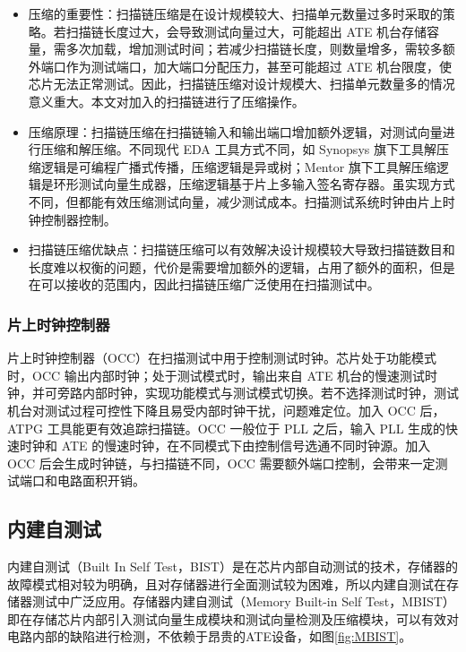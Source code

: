 \begin{itemize}
\item
  压缩的重要性：扫描链压缩是在设计规模较大、扫描单元数量过多时采取的策略。若扫描链长度过大，会导致测试向量过大，可能超出
  ATE
  机台存储容量，需多次加载，增加测试时间；若减少扫描链长度，则数量增多，需较多额外端口作为测试端口，加大端口分配压力，甚至可能超过
  ATE
  机台限度，使芯片无法正常测试。因此，扫描链压缩对设计规模大、扫描单元数量多的情况意义重大。本文对加入的扫描链进行了压缩操作。
\item
  压缩原理：扫描链压缩在扫描链输入和输出端口增加额外逻辑，对测试向量进行压缩和解压缩。不同现代
  EDA 工具方式不同，如 Synopsys
  旗下工具解压缩逻辑是可编程广播式传播，压缩逻辑是异或树；Mentor
  旗下工具解压缩逻辑是环形测试向量生成器，压缩逻辑基于片上多输入签名寄存器。虽实现方式不同，但都能有效压缩测试向量，减少测试成本。扫描测试系统时钟由片上时钟控制器控制。
\item
  扫描链压缩优缺点：扫描链压缩可以有效解决设计规模较大导致扫描链数目和长度难以权衡的问题，代价是需要增加额外的逻辑，占用了额外的面积，但是在可以接收的范围内，因此扫描链压缩广泛使用在扫描测试中。
\end{itemize}

\subsubsection{片上时钟控制器}\label{sec:16-chip-frontend-033}

片上时钟控制器（OCC）在扫描测试中用于控制测试时钟。芯片处于功能模式时，OCC
输出内部时钟；处于测试模式时，输出来自 ATE
机台的慢速测试时钟，并可旁路内部时钟，实现功能模式与测试模式切换。若不选择测试时钟，测试机台对测试过程可控性下降且易受内部时钟干扰，问题难定位。加入
OCC 后，ATPG 工具能更有效追踪扫描链。OCC 一般位于 PLL 之后，输入 PLL
生成的快速时钟和 ATE
的慢速时钟，在不同模式下由控制信号选通不同时钟源。加入 OCC
后会生成时钟链，与扫描链不同，OCC
需要额外端口控制，会带来一定测试端口和电路面积开销。

\subsection{内建自测试}\label{sec:16-chip-frontend-034}

内建自测试（Built In Self
Test，BIST）是在芯片内部自动测试的技术，存储器的故障模式相对较为明确，且对存储器进行全面测试较为困难，所以内建自测试在存储器测试中广泛应用。存储器内建自测试（Memory
Built-in Self
Test，MBIST）即在存储芯片内部引入测试向量生成模块和测试向量检测及压缩模块，可以有效对电路内部的缺陷进行检测，不依赖于昂贵的ATE设备，如图\ref{fig:MBIST}。

